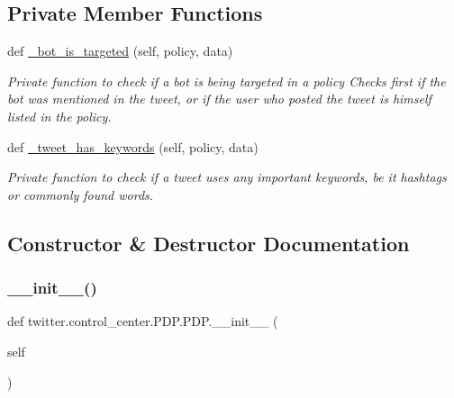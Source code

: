 \subsection*{Private Member Functions}
\begin{DoxyCompactItemize}
\item 
def \hyperlink{classtwitter_1_1control__center_1_1PDP_1_1PDP_a302067b5d102cbe2a5f55355bb204333}{\+\_\+bot\+\_\+is\+\_\+targeted} (self, policy, data)
\begin{DoxyCompactList}\small\item\em Private function to check if a bot is being targeted in a policy Checks first if the bot was mentioned in the tweet, or if the user who posted the tweet is himself listed in the policy. \end{DoxyCompactList}\item 
def \hyperlink{classtwitter_1_1control__center_1_1PDP_1_1PDP_a66187cf251e70e9f579406e45eb16137}{\+\_\+tweet\+\_\+has\+\_\+keywords} (self, policy, data)
\begin{DoxyCompactList}\small\item\em Private function to check if a tweet uses any important keywords, be it hashtags or commonly found words. \end{DoxyCompactList}\end{DoxyCompactItemize}


\subsection{Constructor \& Destructor Documentation}
\mbox{\label{classtwitter_1_1control__center_1_1PDP_1_1PDP_adf406e4b2ad47c65c563ccc7eccaf871}} 
\subsubsection{\texorpdfstring{\+\_\+\+\_\+init\+\_\+\+\_\+()}{\_\_init\_\_()}}
{\footnotesize\ttfamily def twitter.\+control\+\_\+center.\+P\+D\+P.\+P\+D\+P.\+\_\+\+\_\+init\+\_\+\+\_\+ (\begin{DoxyParamCaption}\item[{}]{self }\end{DoxyParamCaption})}

